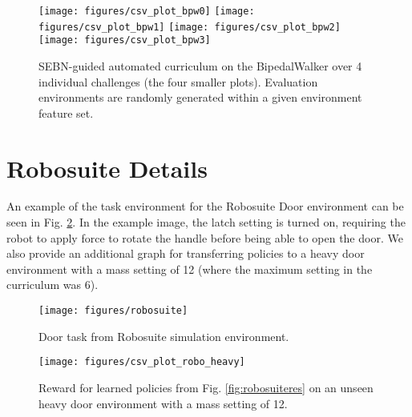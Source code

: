 \begin{figure}
    \texttt{[image: figures/csv\_plot\_bpw0]}
    \texttt{[image: figures/csv\_plot\_bpw1]}
    \texttt{[image: figures/csv\_plot\_bpw2]}
    \texttt{[image: figures/csv\_plot\_bpw3]}
    \caption{SEBN-guided automated curriculum on the BipedalWalker over 4 individual challenges (the four smaller plots). Evaluation environments are randomly generated within a given environment feature set.
    }
    \label{fig:bipedalwalkermulti}
\end{figure}

\section{Robosuite Details}
An example of the task environment for the Robosuite Door environment can be seen in Fig. \ref{fig:robosuiteenv}. In the example image, the latch setting is turned on, requiring the robot to apply force to rotate the handle before being able to open the door. We also provide an additional graph for transferring policies to a heavy door environment with a mass setting of 12 (where the maximum setting in the curriculum was 6). 

\begin{figure}[b]
    \texttt{[image: figures/robosuite]}
    \caption{Door task from Robosuite simulation environment. }
    \label{fig:robosuiteenv}
\end{figure}


\begin{figure}
    \texttt{[image: figures/csv\_plot\_robo\_heavy]}
    \caption{Reward for learned policies from Fig. \ref{fig:robosuiteres} on an unseen heavy door environment with a mass setting of 12.
    }
    \label{fig:robosuiteheavy}
\end{figure}
